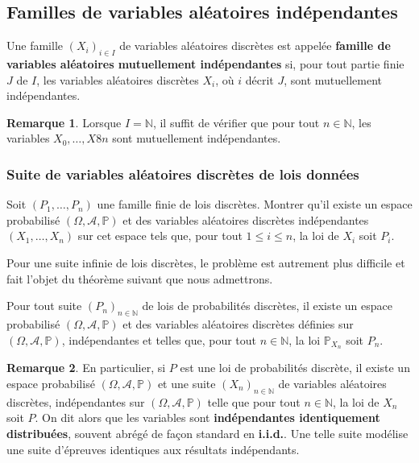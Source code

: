 \documentclass[french]{article}
\renewcommand{\P}{\mathbb{P}}
\newcommand{\N}{\mathbb{N}}
\theoremstyle{plain}
\theoremstyle{definition}
\newtheorem*{rmq}{Remarque}
\theoremstyle{remark}
\begin{document}
\subsection{Familles de variables aléatoires indépendantes}

\begin{dfn}
	Une famille $(X_i)_{i\in I}$ de variables aléatoires discrètes est appelée \textbf{famille de variables aléatoires mutuellement indépendantes} si, pour tout partie finie $J$ de $I$, les variables aléatoires discrètes $X_i$, où $i$ décrit $J$, sont mutuellement indépendantes.
\end{dfn}

\begin{rmq}
	Lorsque $I=\N$, il suffit de vérifier que pour tout $n\in\N$, les variables $X_0,\ldots,X8n$ sont mutuellement indépendantes.
\end{rmq}

\subsubsection*{Suite de variables aléatoires discrètes de lois données}

\begin{exo}
	Soit $(P_1,\ldots,P_n)$ une famille finie de lois discrètes. Montrer qu'il existe un espace probabilisé $(\Omega,\mathcal{A},\P)$ et des variables aléatoires discrètes indépendantes $(X_1,\ldots,X_n)$ sur cet espace tels que, pour tout $1\leqslant i\leqslant n$, la loi de $X_i$ soit $P_i$.
\end{exo}

Pour une suite infinie de lois discrètes, le problème est autrement plus difficile et fait l'objet du théorème suivant que nous admettrons.

\begin{thm}
	Pour tout suite $(P_n)_{n\in\N}$ de lois de probabilités discrètes, il existe un espace probabilisé $(\Omega,\mathcal{A},\P)$ et des variables aléatoires discrètes définies sur $(\Omega,\mathcal{A},\P)$, indépendantes et telles que, pour tout $n\in\N$, la loi $\P_{X_n}$ soit $P_n$.
\end{thm}

\begin{rmq}
	En particulier, si $P$ est une loi de probabilités discrète, il existe un espace probabilisé $(\Omega,\mathcal{A},\P)$ et une suite $(X_n)_{n\in\N}$ de variables aléatoires discrètes, indépendantes sur $(\Omega,\mathcal{A},\P)$ telle que pour tout $n\in\N$, la loi de $X_n$ soit $P$. On dit alors que les variables sont \textbf{indépendantes identiquement distribuées}, souvent abrégé de façon standard en \textbf{i.i.d.}. Une telle suite modélise une suite d'épreuves identiques aux résultats indépendants.
\end{rmq}
\end{document}
